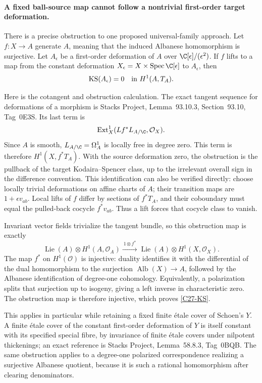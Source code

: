 \documentclass[11pt]{article}
\theoremstyle{definition}\newtheorem{definition}[theorem]{Definition}\newtheorem{remark}[theorem]{Remark}
\begin{document}
\paragraph{A fixed ball-source map cannot follow a nontrivial first-order target deformation.}
There is a precise obstruction to one proposed
universal-family approach.  Let $f:X\to A$ generate
$A$, meaning that the induced Albanese homomorphism
is surjective.  Let $A_\epsilon$ be a first-order
deformation of $A$ over $\C[\epsilon]/(\epsilon^2)$.
If $f$ lifts to a map from the constant deformation
$X_\epsilon=X\times\operatorname{Spec}\C[\epsilon]$
to $A_\epsilon$, then
\begin{equation}\label{C27-KS}
                  \operatorname{KS}(A_\epsilon)=0
                           \quad\hbox{in }H^1(A,T_A).
\end{equation}

Here is the cotangent and obstruction calculation.
The exact tangent sequence for deformations of a
morphism is Stacks Project, Lemma~93.10.3,
Section~93.10, Tag~0E3S.  Its last term is
\[
 \operatorname{Ext}^1_X(Lf^*L_{A/\C},\mathcal O_X).
\]
Since $A$ is smooth, $L_{A/\C}=\Omega^1_A$ is locally
free in degree zero.  This term is therefore
$H^1(X,f^*T_A)$.  With the source deformation zero,
the obstruction is the pullback of the target
Kodaira--Spencer class, up to the irrelevant overall
sign in the difference convention.  This identification
can also be verified directly: choose locally trivial
deformations on affine charts of $A$; their transition
maps are $1+\epsilon v_{ab}$.  Local lifts of $f$
differ by sections of $f^*T_A$, and their coboundary
must equal the pulled-back cocycle $f^*v_{ab}$.
Thus a lift forces that cocycle class to vanish.

Invariant vector fields trivialize the tangent bundle,
so this obstruction map is exactly
\[
 \operatorname{Lie}(A)\otimes H^1(A,\mathcal O_A)
  \xrightarrow{\ 1\otimes f^*\ }
 \operatorname{Lie}(A)\otimes H^1(X,\mathcal O_X).
\]
The map $f^*$ on $H^1(\mathcal O)$ is injective:
duality identifies it with the differential of the
dual homomorphism to the surjection
$\operatorname{Alb}(X)\to A$, followed by the
Albanese identification of degree-one cohomology.
Equivalently, a polarization splits that surjection
up to isogeny, giving a left inverse in characteristic
zero.  The obstruction map is therefore injective,
which proves \eqref{C27-KS}.

This applies in particular while retaining a fixed
finite \'etale cover of Schoen's $Y$.  A finite
\'etale cover of the constant first-order deformation
of $Y$ is itself constant with its specified special
fibre, by invariance of finite \'etale covers under
nilpotent thickenings; an exact reference is Stacks
Project, Lemma~58.8.3, Tag~0BQB.
The same obstruction applies to a degree-one
polarized correspondence realizing a surjective
Albanese quotient, because it is such a rational
homomorphism after clearing denominators.
\end{document}
